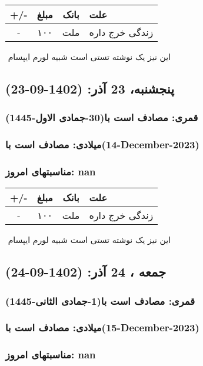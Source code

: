\documentclass{article}
\newcommand{\rnote}[1]{\marginpar{\textcolor{color}{\StrSubstitute{\##1}{ }{\_}}}}
\newcommand{\myRow}[4]{
    #1 & #2 & #3 & #4 \\ \hline
}
\begin{document}
\begin{tabular}{ | c | c | c | p{5cm} |}
    \hline
    \myRow{ +/- }{مبلغ}{بانک}{علت}
    \myRow{-}{۱۰۰}{ملت}{زندگی خرج داره}
\end{tabular}
\newline
\newline

‌
\rnote{تست}
این نیز یک نوشته تستی است شبیه لورم ایپسام




\newpage
{}
\textcolor{color}{
\section{ پنجشنبه، 23 آذر: (1402-09-23) }
\subsubsection*{قمری: مصادف است با(30-جمادی الاول-1445)} 
\subsubsection*{میلادی: مصادف است با(14-December-2023)}
\subsubsection*{مناسبتهای امروز: nan}
}


\begin{tabular}{ | c | c | c | p{5cm} |}
    \hline
    \myRow{ +/- }{مبلغ}{بانک}{علت}
    \myRow{-}{۱۰۰}{ملت}{زندگی خرج داره}
\end{tabular}
\newline
\newline

‌
\rnote{تست}
این نیز یک نوشته تستی است شبیه لورم ایپسام




\newpage
{}
\textcolor{color}{
\section{ جمعه ، 24 آذر: (1402-09-24) }
\subsubsection*{قمری: مصادف است با(1-جمادی الثانی-1445)} 
\subsubsection*{میلادی: مصادف است با(15-December-2023)}
\subsubsection*{مناسبتهای امروز: nan}
}
\end{document}
